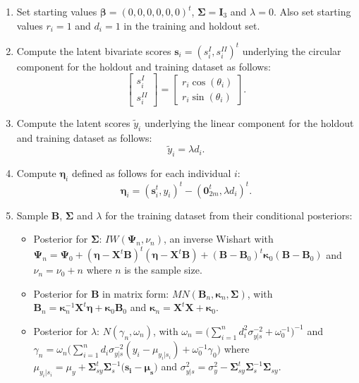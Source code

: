 \documentclass[12pt,]{article}
\begin{document}
\begin{enumerate}
\item Set starting values $\boldsymbol{\beta} = (0,0,0,0,0,0)^t$, $\boldsymbol{\Sigma} = \boldsymbol{I}_3$ and $\lambda = 0$. Also set starting values $r_i = 1$ and $d_i = 1$ in the training and holdout set. 
\item Compute the latent bivariate scores $\boldsymbol{s}_i = (s_i^{I}, s_i^{II})^t$ underlying the circular component for the holdout and training dataset as follows:
$$\begin{bmatrix} s^{I}_{i} \\ s^{II}_{i} \end{bmatrix} = \begin{bmatrix} r_i \cos (\theta_i) \\  r_i\sin (\theta_i)\end{bmatrix}.$$
\item Compute the latent scores $\tilde{y}_i$ underlying the linear component for the holdout and training dataset as follows:
$$\tilde{y}_i = \lambda d_i. $$
\item Compute $\boldsymbol{\eta}_i$ defined as follows for each individual $i$:
$$\boldsymbol{\eta}_i = (\boldsymbol{s}_i^t,y_i)^t - (\boldsymbol{0}_{2m}^t, \lambda d_i)^{t}.$$

\item Sample $\boldsymbol{B}$, $\boldsymbol{\Sigma}$ and $\lambda$ for the training dataset from their conditional posteriors: 

\begin{itemize}
\item Posterior for $\boldsymbol{\Sigma}$: $IW(\boldsymbol{\Psi}_n, \nu_n)$, an inverse Wishart with $\boldsymbol{\Psi}_n = \boldsymbol{\Psi}_0 + (\boldsymbol{\eta} - \boldsymbol{X}^t\boldsymbol{B})^t(\boldsymbol{\eta} - \boldsymbol{X}^t\boldsymbol{B}) + (\boldsymbol{B} - \boldsymbol{B}_0)^t\boldsymbol{\kappa}_0(\boldsymbol{B} - \boldsymbol{B}_0)$ and $\nu_n = \nu_0 + n$ where $n$ is the sample size.
\item Posterior for $\boldsymbol{B}$ in matrix form: $MN(\boldsymbol{B}_n,   \boldsymbol{\kappa}_n, \boldsymbol{\Sigma})$, with $\boldsymbol{B}_n = \boldsymbol{\kappa}_n^{-1}\boldsymbol{X}^t\boldsymbol{\eta} + \boldsymbol{\kappa}_0\boldsymbol{B}_0$ and $\boldsymbol{\kappa}_n = \boldsymbol{X}^t\boldsymbol{X} + \boldsymbol{\kappa}_0$.
\item Posterior for $\lambda$: $N(\gamma_n, \omega_n)$, with $\omega_n = \big(\sum_{i = 1}^{n}d_i^2\sigma^{-2}_{y|s} + \omega_0^{-1}\big)^{-1}$ and $\gamma_n = \omega_n \big(\sum_{i = 1}^{n}d_i\sigma^{-2}_{y|s}(y_i - \mu_{y_i|s_i}) + \omega_0^{-1}\gamma_0 \big)$ where $\mu_{y_i|s_i} = \mu_y + \boldsymbol{\Sigma}_{sy}^{t}\boldsymbol{\Sigma}_{s}^{-1}(\boldsymbol{s_i - \boldsymbol{\mu}_s)}$ and $\sigma^2_{y|s} = \sigma^2_{y} - \boldsymbol{\Sigma}_{sy}^{t}\boldsymbol{\Sigma}_{s}^{-1}\boldsymbol{\Sigma}_{sy}$.
\end{itemize}


\end{enumerate}
\end{document}
